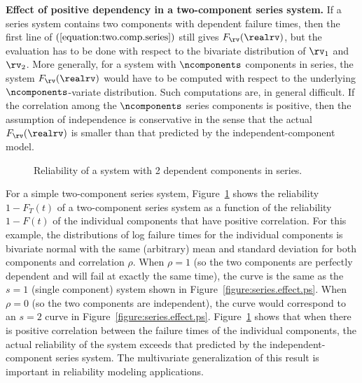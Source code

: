 \noindent
{\bf Effect of positive dependency in a two-component
series system.}
If a series system contains two components with dependent failure
times, then the first line of $(\ref{equation:two.comp.series})$ still
gives $F_{\rv}(\realrv)$, but the evaluation has to be done with
respect to the bivariate distribution of $\rv_{1}$ and $\rv_{2}$. More
generally, for a system with $\ncomponents$ components in series, the system
$F_{\rv}(\realrv)$ would have to be computed with respect to the
underlying $\ncomponents$-variate distribution.  Such computations
are, in general difficult. If the correlation among the $\ncomponents$
series components is positive, then the assumption of independence is
conservative in the sense that the actual $F_{\rv}(\realrv)$ is
smaller than that predicted by the independent-component model.
\begin{figure}
\caption{Reliability of a system with 2 dependent
components in series.}
\label{figure:series.dep.effect.ps}
\end{figure}
For a simple two-component series system,
Figure~\ref{figure:series.dep.effect.ps} shows the reliability
$1-F_{T}(t)$ of a two-component series system as a function of the
reliability $1-F(t)$ of the individual components that have positive
correlation.  For this example, the distributions of log failure
times for the individual components is bivariate normal with the
same (arbitrary) mean and standard deviation for both components and
correlation $\rho$.  When $\rho=1$ (so the two components are
perfectly dependent and will fail at exactly the same time), the
curve is the same as the $s=1$ (single component) system shown in
Figure~\ref{figure:series.effect.ps}. When $\rho=0$ (so the two
components are independent), the curve would correspond to an $s=2$
curve in Figure~\ref{figure:series.effect.ps}.
Figure~\ref{figure:series.dep.effect.ps} shows that when there is
positive correlation between the failure times of the individual
components, the actual reliability of the system exceeds that
predicted by the independent-component series system. The
multivariate generalization of this result is important in
reliability modeling applications.

